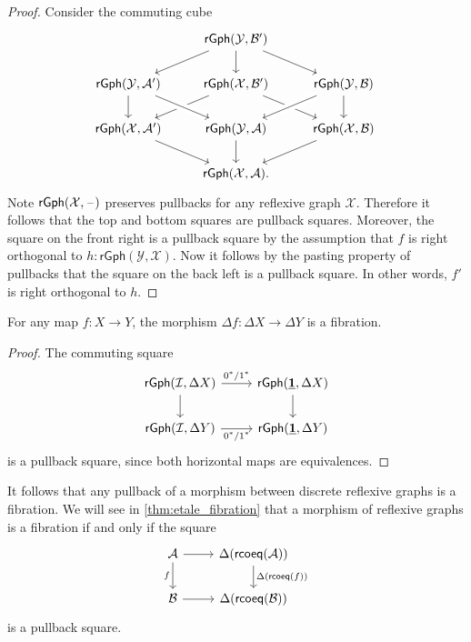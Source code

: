 \begin{proof}
Consider the commuting cube
\begin{equation*}
\begin{tikzcd}
& \mathsf{rGph}(\mathcal{Y},\mathcal{B}') \arrow[dl] \arrow[d] \arrow[dr] \\
\mathsf{rGph}(\mathcal{Y},\mathcal{A}') \arrow[d] & \mathsf{rGph}(\mathcal{X},\mathcal{B}') \arrow[dl] \arrow[dr] & \mathsf{rGph}(\mathcal{Y},\mathcal{B}) \arrow[dl,crossing over] \arrow[d] \\
\mathsf{rGph}(\mathcal{X},\mathcal{A}') \arrow[dr] & \mathsf{rGph}(\mathcal{Y},\mathcal{A}) \arrow[from=ul,crossing over] \arrow[d] & \mathsf{rGph}(\mathcal{X},\mathcal{B}) \arrow[dl] \\
& \mathsf{rGph}(\mathcal{X},\mathcal{A}). & \phantom{\mathsf{rGph}(\mathcal{X},\mathcal{A}')}
\end{tikzcd}
\end{equation*}
Note $\mathsf{rGph}(\mathcal{X},\mathord{\hspace{1pt}\text{--}\hspace{1pt}})$ preserves pullbacks for any reflexive graph $\mathcal{X}$. Therefore it follows that the top and bottom squares are pullback squares. Moreover, the square on the front right is a pullback square by the assumption that $f$ is right orthogonal to $h:\mathsf{rGph}(\mathcal{Y},\mathcal{X})$. Now it follows by the pasting property of pullbacks that the square on the back left is a pullback square. In other words, $f'$ is right orthogonal to $h$. 
\end{proof}

\begin{prp}
For any map $f:X\to Y$, the morphism $\Delta f : \Delta X \to \Delta Y$ is a fibration.
\end{prp}

\begin{proof}
The commuting square
\begin{equation*}
\begin{tikzcd}
\mathsf{rGph}(\mathcal{I},\Delta X) \arrow[d] \arrow[r,"0^\ast/1^\ast"] & \mathsf{rGph}(\unit,\Delta X) \arrow[d] \\
\mathsf{rGph}(\mathcal{I},\Delta Y) \arrow[r,swap,"0^\ast/1^\ast"] & \mathsf{rGph}(\unit,\Delta Y)
\end{tikzcd}
\end{equation*}
is a pullback square, since both horizontal maps are equivalences.
\end{proof}

It follows that any pullback of a morphism between discrete reflexive graphs is a fibration. We will see in \cref{thm:etale_fibration} that a morphism of reflexive graphs is a fibration if and only if the square
\begin{equation*}
\begin{tikzcd}
\mathcal{A} \arrow[d,swap,"f"] \arrow[r] & \Delta(\rcoeq(\mathcal{A})) \arrow[d,"\Delta(\rcoeq(f))"] \\
\mathcal{B} \arrow[r] & \Delta(\rcoeq(\mathcal{B}))
\end{tikzcd}
\end{equation*}
is a pullback square.

